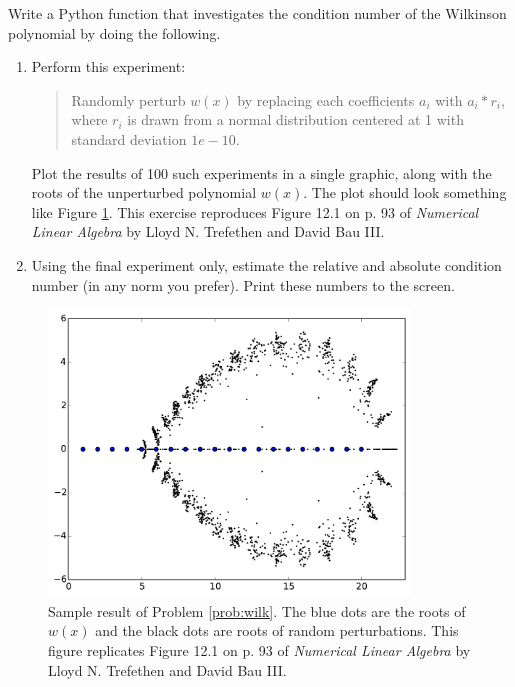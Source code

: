 \begin{problem}\label{prob:wilk}
Write a Python function that investigates the condition number of the Wilkinson polynomial by doing the following.
\begin{enumerate}
\item Perform this experiment:

\begin{quote}
Randomly perturb $w(x)$ by replacing each coefficients $a_i$ with $a_i*r_i$, where $r_i$ is drawn from a normal distribution centered at 1 with standard deviation $1e-10$.
\end{quote}

Plot the results of 100 such experiments in a single graphic, along with the roots of the unperturbed polynomial $w(x)$. The plot should look something like Figure \ref{fig:wilkinsonpolynomial_many}. This exercise reproduces Figure 12.1 on p. 93 of \emph{Numerical Linear Algebra} by Lloyd N. Trefethen and David Bau III.
\item Using the final experiment only, estimate the relative and absolute condition number (in any norm you prefer). Print these numbers to the screen.
\end{enumerate}
\begin{figure}[H]
\includegraphics[height=3in]{wilkinsonpolynomial_many.pdf}
\caption{Sample result of Problem \ref{prob:wilk}.
The blue dots are the roots of $w(x)$ and the black dots are roots of random perturbations.
This figure replicates Figure 12.1 on p. 93 of \emph{Numerical Linear Algebra} by Lloyd N. Trefethen and David Bau III.}
\label{fig:wilkinsonpolynomial_many}
\end{figure}

\end{problem}



